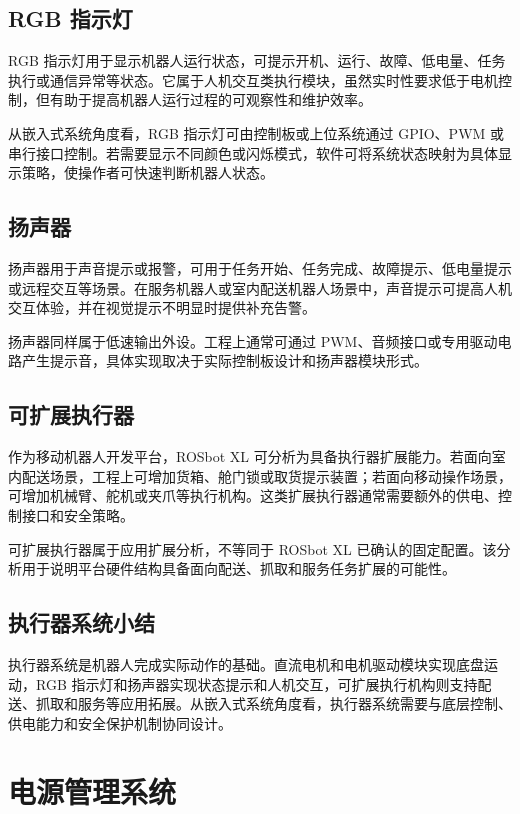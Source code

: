 \documentclass[UTF8,a4paper,12pt]{ctexrep}
\begin{document}
\subsection{RGB 指示灯}

RGB 指示灯用于显示机器人运行状态，可提示开机、运行、故障、低电量、任务执行或通信异常等状态。它属于人机交互类执行模块，虽然实时性要求低于电机控制，但有助于提高机器人运行过程的可观察性和维护效率。

从嵌入式系统角度看，RGB 指示灯可由控制板或上位系统通过 GPIO、PWM 或串行接口控制。若需要显示不同颜色或闪烁模式，软件可将系统状态映射为具体显示策略，使操作者可快速判断机器人状态。

\subsection{扬声器}

扬声器用于声音提示或报警，可用于任务开始、任务完成、故障提示、低电量提示或远程交互等场景。在服务机器人或室内配送机器人场景中，声音提示可提高人机交互体验，并在视觉提示不明显时提供补充告警。

扬声器同样属于低速输出外设。工程上通常可通过 PWM、音频接口或专用驱动电路产生提示音，具体实现取决于实际控制板设计和扬声器模块形式。

\subsection{可扩展执行器}

作为移动机器人开发平台，ROSbot XL 可分析为具备执行器扩展能力。若面向室内配送场景，工程上可增加货箱、舱门锁或取货提示装置；若面向移动操作场景，可增加机械臂、舵机或夹爪等执行机构。这类扩展执行器通常需要额外的供电、控制接口和安全策略。

可扩展执行器属于应用扩展分析，不等同于 ROSbot XL 已确认的固定配置。该分析用于说明平台硬件结构具备面向配送、抓取和服务任务扩展的可能性。

\subsection{执行器系统小结}

执行器系统是机器人完成实际动作的基础。直流电机和电机驱动模块实现底盘运动，RGB 指示灯和扬声器实现状态提示和人机交互，可扩展执行机构则支持配送、抓取和服务等应用拓展。从嵌入式系统角度看，执行器系统需要与底层控制、供电能力和安全保护机制协同设计。

\section{电源管理系统}
\end{document}
